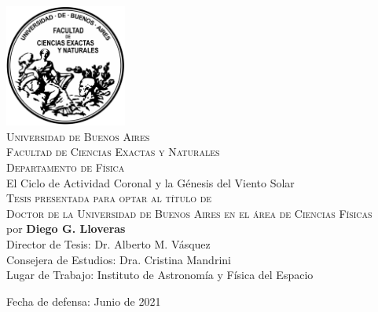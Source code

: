 
\thispagestyle{empty}
\begin{center}

\includegraphics[width=0.3\textwidth]{figuras/Logo-fcenuba.pdf}\\[1cm] 
\textsc{\LARGE Universidad de Buenos Aires}\\[0.5cm]
\textsc{\large Facultad de Ciencias Exactas y Naturales}\\[0.5cm]
\textsc{  Departamento de Física }\\[0.5cm]


{\huge El Ciclo de Actividad Coronal y la Génesis del Viento Solar}\\[0.1cm]

\textsc{ Tesis presentada para optar al título de} \\
\textsc{Doctor de la Universidad de Buenos Aires en el área de Ciencias Físicas}\\[0.1cm]

por {\LARGE \textbf{Diego G. Lloveras}} \\ [0.5cm]

\large {
Director de Tesis: Dr. Alberto M. Vásquez \\[0.2cm]
Consejera de Estudios: Dra. Cristina Mandrini\\[0.2cm]
Lugar de Trabajo: Instituto de Astronomía y Física del Espacio\\ 
}
\vfill

Fecha de defensa: Junio de 2021

\end{center}


